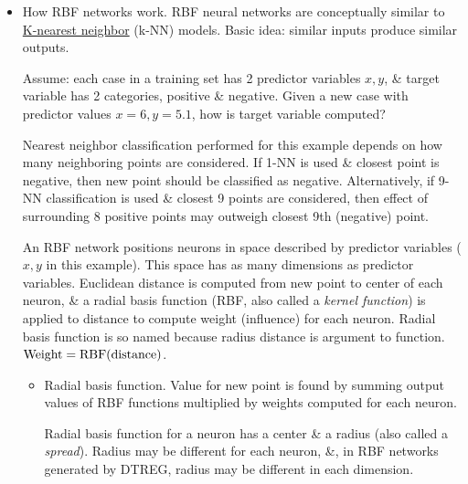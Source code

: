 \documentclass{article}
\begin{document}
\begin{itemize}
	\item {\sf How RBF networks work.} RBF neural networks are conceptually similar to \href{https://en.wikipedia.org/wiki/K-nearest_neighbors_algorithm}{K-nearest neighbor} (k-NN) models. Basic idea: similar inputs produce similar outputs.
	
	Assume: each case in a training set has 2 predictor variables $x,y$, \& target variable has 2 categories, positive \& negative. Given a new case with predictor values $x = 6,y = 5.1$, how is target variable computed?
	
	Nearest neighbor classification performed for this example depends on how many neighboring points are considered. If 1-NN is used \& closest point is negative, then new point should be classified as negative. Alternatively, if 9-NN classification is used \& closest 9 points are considered, then effect of surrounding 8 positive points may outweigh closest 9th (negative) point.
	
	An RBF network positions neurons in space described by predictor variables ($x,y$ in this example). This space has as many dimensions as predictor variables. Euclidean distance is computed from new point to center of each neuron, \& a radial basis function (RBF, also called a {\it kernel function}) is applied to distance to compute weight (influence) for each neuron. Radial basis function is so named because radius distance is argument to function. ${\rm Weight} = {\rm RBF}({\rm distance})$.
	\begin{itemize}
		\item {\sf Radial basis function.} Value for new point is found by summing output values of RBF functions multiplied by weights computed for each neuron.
		
		Radial basis function for a neuron has a center \& a radius (also called a {\it spread}). Radius may be different for each neuron, \&, in RBF networks generated by DTREG, radius may be different in each dimension.
		

\end{itemize}
\end{itemize}
\end{document}
